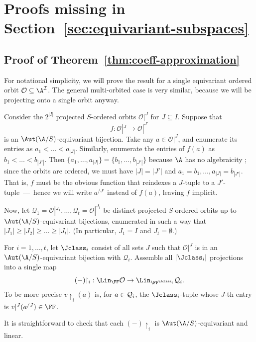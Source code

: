 \section{Proofs missing in Section~\ref{sec:equivariant-subspaces}}\label{sec:appendix-eqsubsp}

\subsection{Proof of Theorem~\ref{thm:coeff-approximation}}
For notational simplicity, we will prove the result for a single equivariant ordered orbit $\cal O \subseteq \A^I$.
The general multi-orbited case is very similar, because we will be projecting onto a single orbit anyway.

Consider the $2^{|I|}$ projected $S$-ordered orbits $\mathcal{O}|^{J}$ for $J \subseteq I$.
Suppose that
\[
    f : \mathcal{O}|^J \to \mathcal{O}|^{J'}
\]
is an $\Aut(\A/S)$-equivariant bijection.
Take any $a \in \mathcal{O}|^J$,
and enumerate its entries as $a_1 < \dots < a_{|J|}$.
Similarly, enumerate the entries of $f(a)$ as $b_1 < \dots < b_{|J'|}$.
Then $\{a_1, \dots, a_{|J|}\} = \{ b_1, \dots, b_{|J'|} \}$ because $\A$ has no algebraicity \cite[Thm.~7.1.8]{hodges1993model}; 
since the orbits are ordered, we must have $|J| = |J'|$ and $a_1 = b_1, \dots, a_{|J|} = b_{|J'|}$.
That is, $f$ must be the obvious function that reindexes a $J$-tuple to a $J'$-tuple~---~hence we will write $a^{/J'}$ instead of $f(a)$, leaving $f$ implicit.

Now, let $\mathcal{Q}_{1} = \mathcal{O}|^{J_1}, \dots, \mathcal{Q}_{t} = \mathcal{O}|^{J_t}$ be distinct projected $S$-ordered orbits up to $\Aut(\A/S)$-equivariant bijections,
enumerated in such a way that $|J_1| \geq |J_2| \geq \dots \geq |J_t|$. (In particular, $J_1=I$ and $J_t=\emptyset$.)

\begin{definition}
    For $i = 1, \dots, t$, let $\Jclass_i$ consist of all sets $J$ such that $\mathcal{O}|^J$ is in an $\Aut(\A/S)$-equivariant bijection with $\mathcal{Q}_i$.
    Assemble all $|\Jclass_i|$ projections into a single map
    \[
        (-){\restriction_i} : \Lin_\FF\mathcal{O} \to \Lin_{\FF^{\Jclass_i}} \mathcal{Q}_i.
    \]
    To be more precise $v{\restriction_i}(a)$ is, for $a\in{\cal Q}_i$, the $\Jclass_i$-tuple whose $J$-th entry is $v|^J(a^{/J}) \in \FF$.
\end{definition}
    It is straightforward to check that each $(-){\restriction_i}$ is $\Aut(\A/S)$-equivariant and linear. 
    
